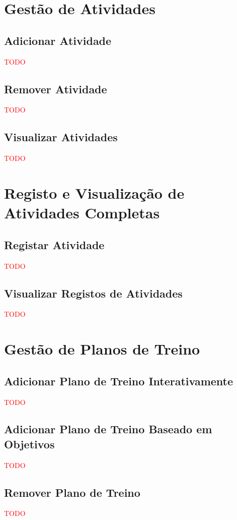 \documentclass[a4paper,12pt]{scrreprt}
\begin{document}
\section{Gestão de Atividades}
    \label{sec:gestao-atividades}
    \subsection{Adicionar Atividade}
    \textcolor{red}{TODO}
    \subsection{Remover Atividade}
    \textcolor{red}{TODO}
    \subsection{Visualizar Atividades}
    \textcolor{red}{TODO}

\section{Registo e Visualização de Atividades Completas}
    \label{sec:registo-atividades}
    \subsection{Registar Atividade}
    \textcolor{red}{TODO}
    \subsection{Visualizar Registos de Atividades}
    \textcolor{red}{TODO}

\section{Gestão de Planos de Treino}
    \label{sec:gestao-planos-treino}
    \subsection{Adicionar Plano de Treino Interativamente}
    \textcolor{red}{TODO}
    \subsection{Adicionar Plano de Treino Baseado em Objetivos}
    \textcolor{red}{TODO}
    \subsection{Remover Plano de Treino}
    \textcolor{red}{TODO}
\end{document}
